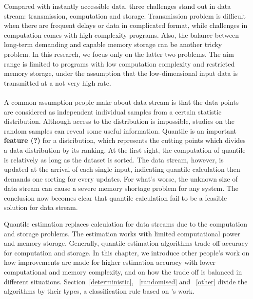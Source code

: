 Compared with instantly accessible data, three challenges stand out in data stream: transmission, computation and storage\cite{muthukrishnanDataStreamsAlgorithms2005}.
Transmission problem is difficult when there are frequent delays or data in complicated format,
while challenges in computation comes with high complexity programs. Also, the balance between long-term demanding and capable memory storage can be another tricky problem.
In this research, we focus only on the latter two problems. The aim range is limited to programs with low computation complexity and restricted memory storage, under the assumption that the low-dimensional input data is transmitted at a not very high rate.
\\\\
A common assumption people make about data stream is that the data points are considered as independent individual samples from a certain statistic distribution. 
Although access to the distribution is impossible, studies on the random samples can reveal some useful information. 
Quantile is an important \textbf{feature (?)} for a distribution, which represents the cutting points which divides a data distribution by its ranking.
At the first sight, the computation of quantile is relatively as long as the dataset is sorted.
The data stream, however, is updated at the arrival of each single input, indicating quantile calculation then demands one sorting for every updates.
For what's worse, the unknown size of data stream can cause a severe memory shortage problem for any system. 
The conclusion now becomes clear that quantile calculation fail to be a feasible solution for data stream.

Quantile estimation replaces calculation for data streams due to the computation and storage problems.
The estimation works with limited computational power and memory storage.
Generally, quantile estimation algorithms trade off accuracy for computation and storage.
In this chapter, we introduce other people's work on how improvements are made for higher estimation accuracy with lower computational and memory complexity, and on how the trade off is balanced in different situations. Section~\ref{deterministic}, ~\ref{randomised} and ~\ref{other} divide the algorithms by their types, a classification rule based on \citeauthor{buragohainQuantilesStreams2009}\cite{buragohainQuantilesStreams2009}'s work.


